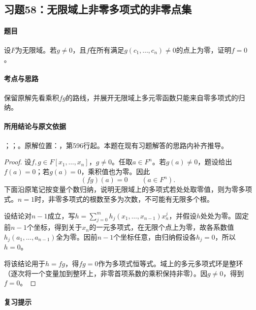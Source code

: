 \subsection{习题58：无限域上非零多项式的非零点集}

\label{ex:3:58}

\paragraph{题目}

设$F$为无限域。若$g\ne0$，且$f$在所有满足$g(c_1,\ldots,c_n)\ne0$的点上为零，证明$f=0$。

\paragraph{考点与思路}

保留原解先看乘积$fg$的路线，并展开无限域上多元零函数只能来自零多项式的归纳。

\paragraph{所用结论与原文依据}

；；。原解位置：，第596行起。本题在现有习题解答的思路内补齐推导。


\begin{proof}

设$f,g\in F[x_1,\ldots,x_n]$，$g\ne0$。任取$a\in F^n$。若$g(a)\ne0$，题设给出$f(a)=0$；若$g(a)=0$，乘积值也为零。因此
\[
(fg)(a)=0\qquad(a\in F^n).
\]
下面沿原笔记按变量个数归纳，说明无限域上的多项式若处处取零值，则为零多项式。$n=1$时，非零多项式的根数至多为次数，不可能有无限多个根。

设结论对$n-1$成立，写$h=\sum_{j=0}^m h_j(x_1,\ldots,x_{n-1})x_n^j$，并假设$h$处处为零。固定前$n-1$个坐标，得到关于$x_n$的一元多项式，在无限个点上为零，故各系数值$h_j(a_1,\ldots,a_{n-1})$全为零。因前$n-1$个坐标任意，由归纳假设各$h_j=0$，所以$h=0$。

将该结论用于$h=fg$，得$fg=0$作为多项式恒等式。域上的多元多项式环是整环（逐次将一个变量加到整环上，非零首项系数的乘积保持非零）。因$g\ne0$，得到$f=0$。

\end{proof}

\paragraph{复习提示}

